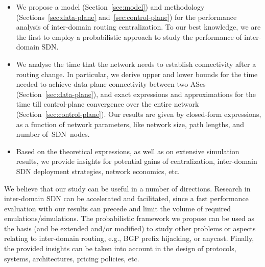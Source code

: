 \begin{itemize}
\item We propose a model (Section~\ref{sec:model}) and methodology (Sections~\ref{sec:data-plane} and~\ref{sec:control-plane}) for the performance analysis of inter-domain routing centralization. To our best knowledge, we are the first to employ a probabilistic approach to study the performance of inter-domain SDN. %

\item We analyse the time that the network needs to establish connectivity after a routing change. In particular, we derive upper and lower bounds for the time needed to achieve data-plane connectivity between two ASes (Section~\ref{sec:data-plane}), and exact expressions and approximations for the time till control-plane convergence over the entire network (Section~\ref{sec:control-plane}). Our results are given by closed-form expressions, as a function of network parameters, like network size, path lengths, and number of~SDN~nodes.

\item Based on the theoretical expressions, as well as on extensive simulation results, we provide insights for potential gains of centralization, inter-domain SDN deployment strategies, network economics, etc.


\end{itemize}

We believe that our study can be useful in a number of directions. Research in inter-domain SDN can be accelerated and facilitated, since a fast performance evaluation with our results can precede and limit the volume of required emulations/simulations. The probabilistic framework we propose can be used as the basis (and be extended and/or modified) to study other problems or aspects relating to inter-domain routing, e.g., BGP prefix hijacking, or anycast. Finally, the provided insights can be taken into account in the design of protocols, systems, architectures, pricing policies, etc.
